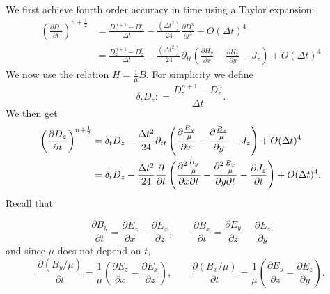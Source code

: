 \documentclass[12pt,reqno]{amsart}
\theoremstyle{definition}
\numberwithin{equation}{section}
\begin{document}
				We first achieve fourth order accuracy in time using a Taylor expansion:
			\begin{align*}
				\left (\frac{\partial D_z}{\partial t} \right)^{n+\frac{1}{2}} &= \frac{D_z^{n+1} - D_z^{n}}{\Delta t} - \frac{(\Delta t^2)}{24} \frac{\partial D^3_z}{\partial t^3} + O(\Delta t)^4 \\
				&= \frac{D_z^{n+1} - D_z^{n}}{\Delta t} - \frac{(\Delta t^2)}{24} \partial_{tt} \left(\frac{\partial H_y}{\partial x}
				- \frac{\partial H_x}{\partial y} -  J_z \right)
				+ O(\Delta t)^4
			\end{align*}
			We now use the relation $H \!=\! \frac{1}{\mu} B$. For simplicity we define
			\begin{equation}
				\label{Dhat}
				\delta_t D_z: = \frac{D_z^{n+1} - D_z^{n}}{\Delta t} .
			\end{equation}
			We then get
			\begin{align*}
				\left (\frac{\partial D_z}{\partial t} \right)^{n+\frac{1}{2}}  &= \delta_t D_z - \frac{\Delta t^2}{24} \partial_{tt} \left(\frac{\partial {B_y \over \mu}}{\partial x }
				- \frac{\partial{B_x \over \mu}}{\partial y} - J_z \right) + O(\Delta t)^4 \\
				&= \delta_t D_z - \frac{\Delta t^2}{24} \frac{\partial}{\partial t} \left(\frac{\partial^2 {B_y \over \mu}}{\partial x \partial t}
				- \frac{\partial^2 {B_x \over \mu}}{\partial y \partial t} - \frac{\partial J_z}{\partial t} \right) + O(\Delta t)^4.
			\end{align*}
			Recall that 
			
			$$
			\frac{\partial B_y}{\partial t}=\frac{\partial E_z}{\partial x}-\frac{\partial E_x}{\partial z},\qquad
			\frac{\partial B_x}{\partial t}=\frac{\partial E_y}{\partial z}-\frac{\partial E_z}{\partial y}
			$$
			and since $\mu$ does not depend on $t$,
			$$
			\frac{\partial (B_y/\mu)}{\partial t}=
			\frac{1}{\mu}\left (
			\frac{\partial E_z}{\partial x}-\frac{\partial E_x}{\partial z}
			\right), \qquad
			\frac{\partial (B_x/\mu)}{\partial t}=
			\frac{1}{\mu}\left (
			\frac{\partial E_y}{\partial z}-\frac{\partial E_z}{\partial y}
			\right) .
			$$
			
\end{document}
